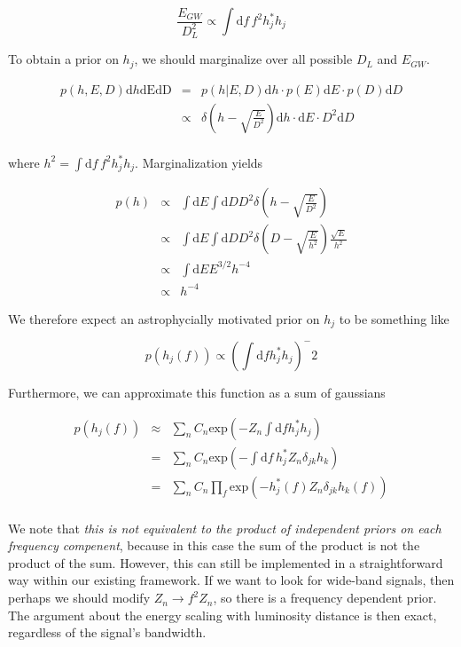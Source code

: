 \documentclass[10pt]{article}
\begin{document}
\begin{equation}
\frac{E_{GW}}{D_L^2} \propto \int\mathrm{d}f\, f^2 h_j^\ast h_j
\end{equation}

To obtain a prior on $h_j$, we should marginalize over all possible $D_L$ and $E_{GW}$.

\begin{eqnarray}
p(h,E,D)\mathrm{d}h\mathrm{dE}\mathrm{dD} & = & p(h|E,D)\mathrm{d}h \cdot p(E)\mathrm{d}E \cdot p(D)\mathrm{d}D \\
                                          & \propto & \delta\left(h-\sqrt{\frac{E}{D^2}}\right)\mathrm{d}h \cdot \mathrm{d}E \cdot D^2 \mathrm{d}D \\
\end{eqnarray}

where $h^2=\int\mathrm{d}f\, f^2 h_j^\ast h_j$. Marginalization yields

\begin{eqnarray}
p(h) & \propto & \int\mathrm{d}E\int\mathrm{d}D D^2 \delta\left(h-\sqrt{\frac{E}{D^2}}\right) \\
     & \propto & \int\mathrm{d}E\int\mathrm{d}D D^2 \delta\left(D-\sqrt{\frac{E}{h^2}}\right)\frac{\sqrt{E}}{h^2} \\
     & \propto & \int\mathrm{d}E E^{3/2} h^{-4} \\
     & \propto & h^{-4}
\end{eqnarray}

We therefore expect an astrophycially motivated prior on $h_j$ to be something like

\begin{equation}
p(h_j(f)) \propto \left(\int\mathrm{d}f h_j^\ast h_j \right)^-2
\end{equation}

Furthermore, we can approximate this function as a sum of gaussians

\begin{eqnarray}
p(h_j(f)) & \approx & \sum\limits_n C_n \mathrm{exp}\left(-Z_n \int\mathrm{d}f h_j^\ast h_j \right) \\
          & = & \sum\limits_n C_n \mathrm{exp}\left(-\int\mathrm{d}f\, h_j^\ast Z_n\delta_{jk} h_k\right) \\
          & = & \sum\limits_n C_n \prod\limits_f \mathrm{exp}\left(-h_j^\ast(f) Z_n\delta_{jk} h_k(f)\right) \\
\end{eqnarray}

We note that \emph{this is not equivalent to the product of independent priors on each frequency compenent}, because in this case the sum of the product is not the product of the sum. However, this can still be implemented in a straightforward way within our existing framework. If we want to look for wide-band signals, then perhaps we should modify $Z_n\rightarrow f^2 Z_n$, so there is a frequency dependent prior. The argument about the energy scaling with luminosity distance is then exact, regardless of the signal's bandwidth.
\end{document}
